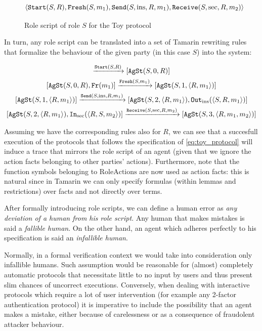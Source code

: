 \documentclass{article}
\newcommand{\mono}[1]{\textrm{\tt #1}}
\begin{document}
\begin{figure}
\begin{equation*}
    \langle \mono{Start}(S,R), \mono{Fresh}(S, m_1), \mono{Send}(S, \textrm{ins}, R, m_1), \mono{Receive}(S, \textrm{sec}, R, m_2) \rangle
\end{equation*}
\caption{Role script of role $S$ for the Toy protocol}
\end{figure}

In turn, any role script can be translated into a set of Tamarin rewriting rules that formalize the behaviour of the given party (in this case $S$) into the system:

\begin{gather*}
    [ \ ] \xrightarrow{\mono{Start}(S,R)} [\mono{AgSt}(S,0,R)]\\
    [\mono{AgSt}(S,0,R), \mono{Fr}(m_1)] \xrightarrow{\mono{Fresh}(S,m_1)} [\mono{AgSt}(S,1,\langle R,m_1 \rangle)]\\
    [\mono{AgSt}(S,1,\langle R,m_1 \rangle)] \xrightarrow{\mono{Send}(S,\textrm{ins},R,m_1)} [\mono{AgSt}(S,2,\langle R,m_1 \rangle), \mono{Out}_\textrm{ins}(\langle S, R, m_1 \rangle)]\\
    [\mono{AgSt}(S,2,\langle R,m_1 \rangle), \mono{In}_\textrm{sec}(\langle R, S, m_2 \rangle)] \xrightarrow{\mono{Receive}(S, \textrm{sec}, R, m_2)} [\mono{AgSt}(S,3,\langle R, m_1, m_2 \rangle)]
\end{gather*}

Assuming we have the corresponding rules also for $R$, we can see that a succesfull execution of the protocols that follows the specification of \ref{eq:toy_protocol} will induce a trace that mirrors the role script of an agent (given that we ignore the action facts belonging to other parties' actions). Furthermore, note that the function symbols belonging to $\textrm{RoleActions}$ are now used as action facts: this is natural since in Tamarin we can only specify formulas (within lemmas and restrictions) over facts and not directly over terms.

After formally introducing role scripts, we can define a human error as \textit{any deviation of a human from his role script}. Any human that makes mistakes is said a \textit{fallible human}. On the other hand, an agent which adheres perfectly to his specification is said an \textit{infallible human}.

Normally, in a formal verification context we would take into consideration only infallible humans. Such assumption would be reasonable for (almost) completely automatic protocols that necessitate little to no input by users and thus present slim chances of uncorrect executions. Conversely, when dealing with interactive protocols which require a lot of user intervention (for example any 2-factor authentication protocol) it is imperative to include the possibility that an agent makes a mistake, either because of carelessness or as a consequence of fraudolent attacker behaviour.
\end{document}
